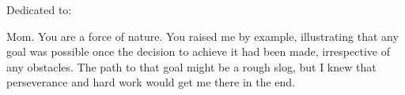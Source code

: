 %
%
\thispagestyle{empty}
{}

\vspace*{3cm}

%

\begin{center}
    Dedicated to:

\par
    Mom.  You are a force of nature.  You raised me by example, illustrating that any goal was possible once the decision to achieve it had been made, irrespective of any obstacles.  The path to that goal might be a rough slog, but I knew that perseverance and hard work would get me there in the end.

\end{center}
